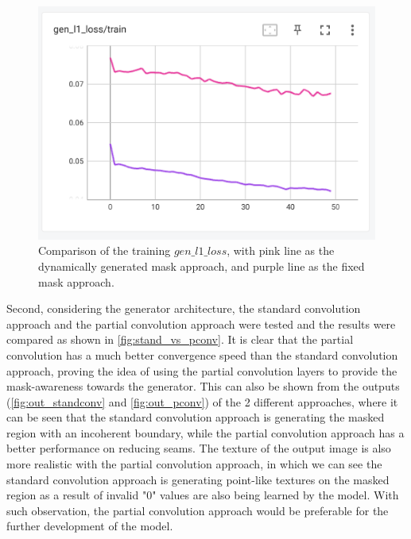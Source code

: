 \documentclass[10pt,twocolumn,letterpaper]{article}
\begin{document}
\begin{figure}[t]
    \centering
    \includegraphics[width=\linewidth]{figures/milestone/gen_vs_fix.png}
    \caption{Comparison of the training $gen\_l1\_loss$, with pink line as the dynamically generated mask approach, and purple line as the fixed mask approach.}
    \label{fig:gen_vs_fix}
\end{figure}

Second, considering the generator architecture, the standard convolution approach and the partial convolution approach were tested and the results were compared as shown in \cref{fig:stand_vs_pconv}. It is 
clear that the partial convolution has a much better convergence speed than the standard convolution approach, proving the idea of using the partial convolution layers to provide the mask-awareness towards 
the generator. This can also be shown from the outputs (\cref{fig:out_standconv} and \cref{fig:out_pconv}) of the 2 different approaches, where it can be seen that the standard convolution approach is 
generating the masked region with an incoherent boundary, while the partial convolution approach has a better performance on reducing seams. The texture of the output image is also more realistic with the 
partial convolution approach, in which we can see the standard convolution approach is generating point-like textures on the masked region as a result of invalid "0" values are also being learned by the model. 
With such observation, the partial convolution approach would be preferable for the further development of the model. 
\end{document}
